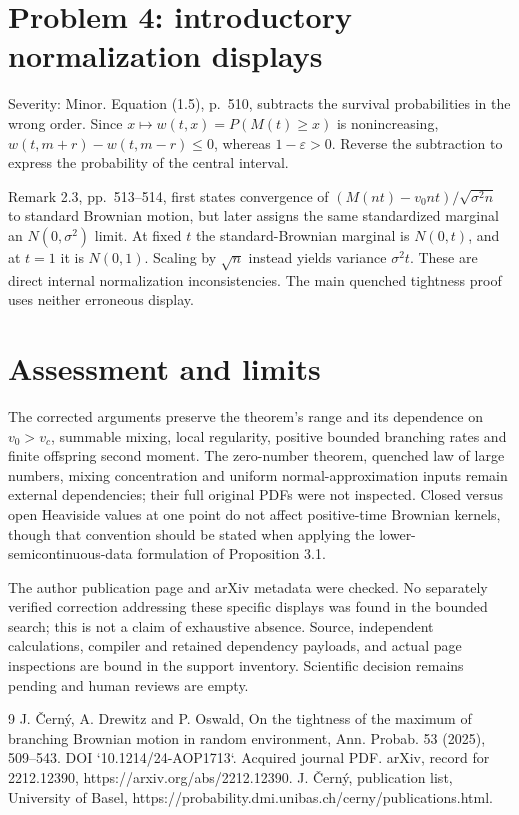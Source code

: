 \documentclass[10pt]{article}
\begin{document}
\section*{Problem 4: introductory normalization displays}
Severity: Minor. Equation (1.5), p. 510, subtracts the survival probabilities in the wrong order. Since \(x\mapsto w(t,x)=P(M(t)\ge x)\) is nonincreasing, \(w(t,m+r)-w(t,m-r)\le0\), whereas \(1-\varepsilon>0\). Reverse the subtraction to express the probability of the central interval.\par
Remark 2.3, pp. 513–514, first states convergence of \((M(nt)-v_0nt)/\sqrt{\sigma^2n}\) to standard Brownian motion, but later assigns the same standardized marginal an \(N(0,\sigma^2)\) limit. At fixed \(t\) the standard-Brownian marginal is \(N(0,t)\), and at \(t=1\) it is \(N(0,1)\). Scaling by \(\sqrt n\) instead yields variance \(\sigma^2t\). These are direct internal normalization inconsistencies. The main quenched tightness proof uses neither erroneous display.\par
\section*{Assessment and limits}
The corrected arguments preserve the theorem’s range and its dependence on \(v_0>v_c\), summable mixing, local regularity, positive bounded branching rates and finite offspring second moment. The zero-number theorem, quenched law of large numbers, mixing concentration and uniform normal-approximation inputs remain external dependencies; their full original PDFs were not inspected. Closed versus open Heaviside values at one point do not affect positive-time Brownian kernels, though that convention should be stated when applying the lower-semicontinuous-data formulation of Proposition 3.1.\par
The author publication page and arXiv metadata were checked. No separately verified correction addressing these specific displays was found in the bounded search; this is not a claim of exhaustive absence. Source, independent calculations, compiler and retained dependency payloads, and actual page inspections are bound in the support inventory. Scientific decision remains pending and human reviews are empty.\par
9 J. Černý, A. Drewitz and P. Oswald, On the tightness of the maximum of branching Brownian motion in random environment, Ann. Probab. 53 (2025), 509–543. DOI `10.1214/24-AOP1713`. Acquired journal PDF. arXiv, record for 2212.12390, https://arxiv.org/abs/2212.12390. J. Černý, publication list, University of Basel, https://probability.dmi.unibas.ch/cerny/publications.html.\par
\end{document}

